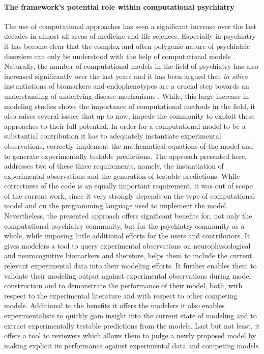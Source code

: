 \documentclass[a4paper,10pt]{article}
\begin{document}
\paragraph{The framework's potential role within computational psychiatry}
The use of computational approaches has seen a significant increase over the last decades in almost all areas of medicine and life sciences. Especially in psychiatry it has 
become clear that the complex and often polygenic nature of psychiatric disorders can only be understood with the help of computational models \cite{Adams2016,Wang2014,Friston2014,Corlett2014,Stephan2014,
Montague2012,Siekmeier2015}.
Naturally, the number of computational models in the field of psychiatry has also increased significantly over the last years and it has been argued that 
\textit{in silico} instantiations of biomarkers and endophenotypes are a crucial step towards an understanding of underlying disease mechanisms \cite{Siekmeier2015}. While, this large increase in 
modeling studies shows the importance of computational methods in the field, it also raises several issues that up to now, impede the community to exploit these 
approaches to their full potential. In order for a computational model to be a substantial contribution it has to adequately instantiate experimental observations,
correctly implement the mathematical equations of the model and to generate experimentally testable predictions. The approach presented here, addresses two of these three requirements, namely, 
the instantiation of experimental observations and the generation of testable predictions. While correctness of the code is an equally important requirement, it was out of scope of the
current work, since it very strongly depends on the type of computational model and on the programming language used to implement the model. Nevertheless, the presented
approach offers significant benefits for, not only the computational psychiatry community, but for the psychiatry community as a whole, while imposing little additional efforts
for the users and contributors. It gives modelers a tool to query experimental observations on neurophysiological and neurocognitive biomarkers and therefore, helps them to
include the current relevant experimental data into their modeling efforts. It further enables them to validate their modeling output against experimental observations during model construction
and to demonstrate the performance of their model, both, with respect to the experimental literature and with respect to other competing models. Additional to the benefits it offers
the modelers it also enables experimentalists to quickly gain insight into the current state of modeling and to extract experimentally testable predictions from the models. Last but not least,
it offers a tool to reviewers which allows them to judge a newly proposed model by making explicit its performance against experimental data and competing models.
\end{document}
